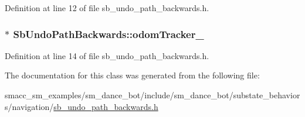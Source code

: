 Definition at line 12 of file sb\+\_\+undo\+\_\+path\+\_\+backwards.\+h.

\subsubsection[{\texorpdfstring{odom\+Tracker\+\_\+}{odomTracker_}}]{$\ast$ Sb\+Undo\+Path\+Backwards\+::odom\+Tracker\+\_\+\hspace{0.3cm}{\ttfamily [private]}}\hypertarget{classSbUndoPathBackwards_a4e543595d070980fb5cb621232904048}{}\label{classSbUndoPathBackwards_a4e543595d070980fb5cb621232904048}


Definition at line 14 of file sb\+\_\+undo\+\_\+path\+\_\+backwards.\+h.



The documentation for this class was generated from the following file\+:\begin{DoxyCompactItemize}
\item 
smacc\+\_\+sm\+\_\+examples/sm\+\_\+dance\+\_\+bot/include/sm\+\_\+dance\+\_\+bot/substate\+\_\+behaviors/navigation/\hyperlink{sb__undo__path__backwards_8h}{sb\+\_\+undo\+\_\+path\+\_\+backwards.\+h}\end{DoxyCompactItemize}
